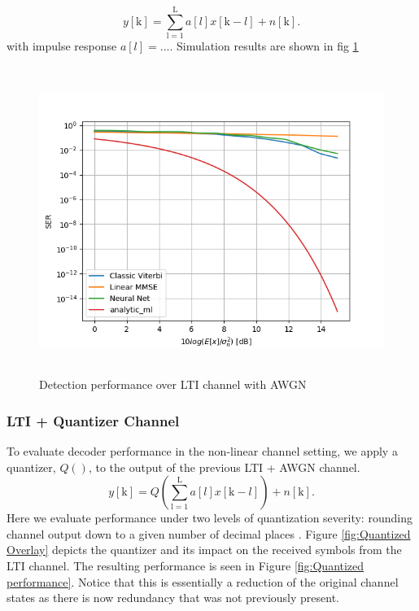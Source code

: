 \documentclass[12pt,a4paper]{report}
\begin{document}
\begin{equation*}
y[\text{k}] = \sum_{\mathrm{l=1}}^{\mathrm{L}} a[l]x[\text{k}-l] + n[\text{k}].
\end{equation*}
with impulse response $a[l] = ...$.
Simulation results are shown in fig \ref{fig:LTI performance}
\begin{figure}[H]
	\includegraphics[width=\textwidth,height = 10cm]{results/lti_normal}
		  \caption{Detection performance over LTI channel with AWGN}
	  \label{fig:LTI performance}
\end{figure}

\subsubsection{LTI + Quantizer Channel}

To evaluate decoder performance in the non-linear channel setting, we apply a quantizer, $Q()$, to the output of the previous LTI + AWGN channel.
\begin{equation*}
y[\text{k}] = Q(\sum_{\mathrm{l=1}}^{\mathrm{L}} a[l]x[\text{k}-l]) + n[\text{k}].
\end{equation*}
 Here we evaluate performance under two levels of quantization severity: rounding channel output down to a given number of decimal places . Figure \ref{fig:Quantized Overlay} depicts the quantizer and its impact on the received symbols from the LTI channel. The resulting performance is seen in Figure \ref{fig:Quantized performance}. Notice that this is essentially a reduction of the original channel states as there is now redundancy that was not previously present. 
\end{document}
